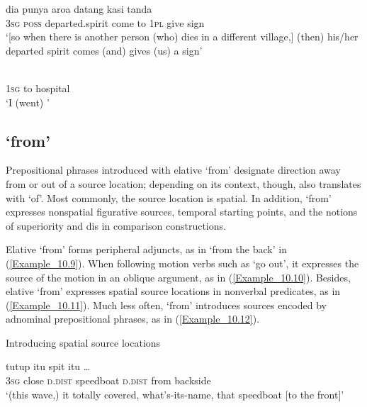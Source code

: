 \ea
\label{Example_10.7}
\gll {\ldots} {dia} {punya} {aroa} {datang} {} {} {kasi} {tanda}\\ %
  {} \textsc{3sg}  \textsc{poss}  departed.spirit  come  to  \textsc{1pl}  give  sign\\
\glt 
‘[so when there is another person (who) dies in a different village,] (then) his/her departed spirit comes  (and) gives (us) a sign’ \textstyleExampleSource{[081014-014-NP.0048]}
\z

\ea
\label{Example_10.8}
 {} {}\\ %
 \textsc{1sg}  to  hospital\\
\glt
‘I (went) ’ \textstyleExampleSource{[081015-005-NP.0047]}
\z

\subsection{ ‘from’}
\label{Para_10.1.3}
Prepositional phrases introduced with elative  ‘from’ designate direction away from or out of a source location; depending on its context, though,  also translates with ‘of’. Most commonly, the source location is spatial. In addition,  ‘from’ expresses nonspatial figurative sources, temporal starting points, and the notions of superiority and dis in comparison constructions.



Elative  ‘from’ forms peripheral adjuncts, as in  ‘from the back’ in (\ref{Example_10.9}). When following motion verbs such as  ‘go out’, it expresses the source of the motion in an oblique argument, as in (\ref{Example_10.10}). Besides, elative  ‘from’ expresses spatial source locations in nonverbal predicates, as in (\ref{Example_10.11}). Much less often,  ‘from’ introduces sources encoded by adnominal prepositional phrases, as in (\ref{Example_10.12}).


\begin{styleExampleTitle}
Introducing spatial source locations
\end{styleExampleTitle}

\ea
\label{Example_10.9}
 {tutup} {itu} {spit} {itu} {} {} {\ldots}\\ %
 \textsc{3sg}  close  \textsc{d.dist}  speedboat  \textsc{d.dist}  from  backside  \\
\glt 
‘(this wave,) it totally covered, what’s-its-name, that speedboat  [to the front]’ \textstyleExampleSource{[080923-015-CvEx.0021]}
\z

